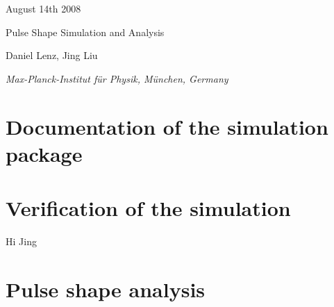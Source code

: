 \documentclass[11pt, a4paper]{article}
\begin{document}

\begin{titlepage}

\begin{figure}
\end{figure} 

\hspace{10.8cm} August 14th 2008 \\ 

\begin{center}

\vspace{1.0cm}

{\Large Pulse Shape Simulation and Analysis\\ } 

\vspace{0.5cm} 


\vspace{1.0cm}

{\large 
Daniel Lenz, Jing Liu
}

\vspace{1.0cm}

{\it 
Max-Planck-Institut f\"ur Physik, M\"unchen, Germany
} 
\vspace{2.0cm} 

\end{center} 

 

\end{titlepage} 



\tableofcontents

\pagebreak 


\section{Documentation of the simulation package}
\label{sec:manual}



\section{Verification of the simulation}
\label{sec:verify}

Hi Jing

\section{Pulse shape analysis}
\label{sec:physics}


\clearpage
 
\begin{thebibliography}{sotief}


\end{thebibliography}
\end{document}
